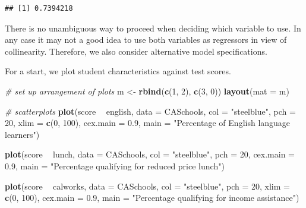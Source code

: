 \documentclass[]{book}
\newenvironment{Shaded}{\begin{snugshade}}{\end{snugshade}}
\newcommand{\KeywordTok}[1]{\textcolor[rgb]{0.13,0.29,0.53}{\textbf{#1}}}
\newcommand{\DataTypeTok}[1]{\textcolor[rgb]{0.13,0.29,0.53}{#1}}
\newcommand{\DecValTok}[1]{\textcolor[rgb]{0.00,0.00,0.81}{#1}}
\newcommand{\FloatTok}[1]{\textcolor[rgb]{0.00,0.00,0.81}{#1}}
\newcommand{\StringTok}[1]{\textcolor[rgb]{0.31,0.60,0.02}{#1}}
\newcommand{\CommentTok}[1]{\textcolor[rgb]{0.56,0.35,0.01}{\textit{#1}}}
\newcommand{\OperatorTok}[1]{\textcolor[rgb]{0.81,0.36,0.00}{\textbf{#1}}}
\newcommand{\NormalTok}[1]{#1}
\theoremstyle{definition}
\theoremstyle{definition}
\theoremstyle{definition}
\theoremstyle{remark}
\begin{document}
\begin{Shaded}
\end{Shaded}

\begin{verbatim}
## [1] 0.7394218
\end{verbatim}

There is no unambiguous way to proceed when deciding which variable to
use. In any case it may not a good idea to use both variables as
regressors in view of collinearity. Therefore, we also consider
alternative model specifications.

For a start, we plot student characteristics against test scores.

\begin{Shaded}
\begin{Highlighting}[]
\CommentTok{# set up arrangement of plots}
\NormalTok{m <-}\StringTok{ }\KeywordTok{rbind}\NormalTok{(}\KeywordTok{c}\NormalTok{(}\DecValTok{1}\NormalTok{, }\DecValTok{2}\NormalTok{), }\KeywordTok{c}\NormalTok{(}\DecValTok{3}\NormalTok{, }\DecValTok{0}\NormalTok{))}
\KeywordTok{layout}\NormalTok{(}\DataTypeTok{mat =}\NormalTok{ m)}

\CommentTok{# scatterplots}
\KeywordTok{plot}\NormalTok{(score }\OperatorTok{~}\StringTok{ }\NormalTok{english, }
     \DataTypeTok{data =}\NormalTok{ CASchools, }
     \DataTypeTok{col =} \StringTok{"steelblue"}\NormalTok{, }
     \DataTypeTok{pch =} \DecValTok{20}\NormalTok{, }
     \DataTypeTok{xlim =} \KeywordTok{c}\NormalTok{(}\DecValTok{0}\NormalTok{, }\DecValTok{100}\NormalTok{),}
     \DataTypeTok{cex.main =} \FloatTok{0.9}\NormalTok{,}
     \DataTypeTok{main =} \StringTok{"Percentage of English language learners"}\NormalTok{)}

\KeywordTok{plot}\NormalTok{(score }\OperatorTok{~}\StringTok{ }\NormalTok{lunch, }
     \DataTypeTok{data =}\NormalTok{ CASchools, }
     \DataTypeTok{col =} \StringTok{"steelblue"}\NormalTok{, }
     \DataTypeTok{pch =} \DecValTok{20}\NormalTok{,}
     \DataTypeTok{cex.main =} \FloatTok{0.9}\NormalTok{,}
     \DataTypeTok{main =} \StringTok{"Percentage qualifying for reduced price lunch"}\NormalTok{)}

\KeywordTok{plot}\NormalTok{(score }\OperatorTok{~}\StringTok{ }\NormalTok{calworks, }
     \DataTypeTok{data =}\NormalTok{ CASchools, }
     \DataTypeTok{col =} \StringTok{"steelblue"}\NormalTok{, }
     \DataTypeTok{pch =} \DecValTok{20}\NormalTok{, }
     \DataTypeTok{xlim =} \KeywordTok{c}\NormalTok{(}\DecValTok{0}\NormalTok{, }\DecValTok{100}\NormalTok{),}
     \DataTypeTok{cex.main =} \FloatTok{0.9}\NormalTok{,}
     \DataTypeTok{main =} \StringTok{"Percentage qualifying for income assistance"}\NormalTok{)}
\end{Highlighting}
\end{Shaded}
\end{document}
